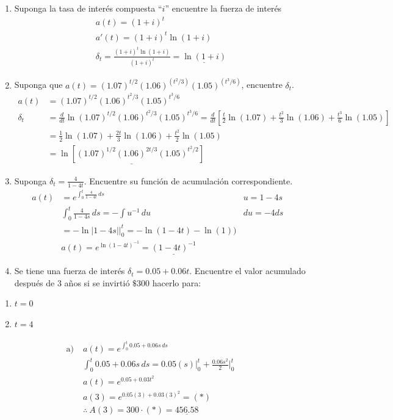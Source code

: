 \documentclass[
]{book}
\theoremstyle{definition}
\theoremstyle{definition}
\theoremstyle{definition}
\theoremstyle{definition}
\theoremstyle{remark}
\begin{document}
\begin{enumerate}
\def\labelenumi{\arabic{enumi}.}
\setcounter{enumi}{1}
\item
  Suponga la tasa de interés compuesta ``\(i\)'' encuentre la fuerza de interés
  \begin{align*}
  &a(t) = (1+i)^t&\\
  &a'(t) = (1+i)^t\ln(1+i)&\\
  &\delta_t = \frac{(1+i)^t\ln(1+i)}{(1+i)^t} = \underline{\ln(1+i)}&
  \end{align*}
\item
  Suponga que \(a(t) = (1.07)^{t/2}(1.06)^{(t^2/3)}(1.05)^{(t^3/6)}\), encuentre \(\delta_t\).
  \begin{align*}
  a(t) &= (1.07)^{t/2}(1.06)^{t^2/3}(1.05)^{t^3/6}&\\
  \delta_t &= \frac{d}{d t} \ln(1.07)^{t/2}(1.06)^{t^2/3}(1.05)^{t^3/6} = \frac{d}{d t}\left[\frac{t}{2}\ln(1.07) + \frac{t^2}{3}\ln(1.06) + \frac{t^3}{6}\ln(1.05) \right] &\\
  &=\frac{1}{2}\ln(1.07) + \frac{2t}{3}\ln(1.06) + \frac{t^2}{2}\ln(1.05)&\\
  &=\underline{\ln\left[(1.07)^{1/2}(1.06)^{2t/3}(1.05)^{t^2/2} \right]} &
  \end{align*}
\item
  Suponga \(\delta_t = \frac{4}{1-4t}\). Encuentre su función de acumulación correspondiente.
  \begin{align*}
  a(t) &= e ^{\int_{0}^{t} \frac{4}{1-4t} \, ds}  & u = 1-4s&\\
   &\int_{0}^{t} \frac{4}{1-4s} \, ds = -\int u^{-1}\, du &du = -4ds&\\
  &= -\ln|1-4s|\big|_0^t = - \ln(1-4t) -\ln(1))&\\
  &a(t) = e^{\ln(1-4t)^{-1}} = \underline{(1-4t)^{-1}}&
  \end{align*}
\item
  Se tiene una fuerza de interés \(\delta_t = 0.05 + 0.06t\). Encuentre el valor acumulado después de 3 años si se invirtió \(\$300\) hacerlo para:
\end{enumerate}

\begin{enumerate}
\def\labelenumi{\alph{enumi})}
\item
  \(t = 0\)
\item
  \(t = 4\)
\end{enumerate}

\begin{align*}
\text{a)} \; &a(t) = e^{\int_{0}^{t} 0.05 + 0.06s \, ds}&\\
&\int_{0}^{t} 0.05 + 0.06s \, ds = 0.05(s)\big|_0^t + \frac{0.06s^2}{2}\big|_0^t &\\
&a(t) = e^{0.05 + 0.03t^2}&\\
&a(3) = e^{0.05(3) + 0.03(3)^2} = (*)&\\
&\therefore \: A(3) = 300 \cdot (*) = \underline{456.58}
\end{align*}
\end{document}

